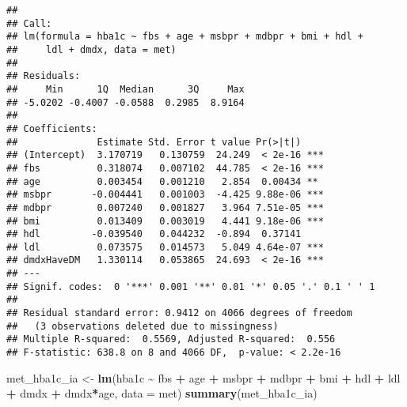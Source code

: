 \documentclass[
]{article}
\newenvironment{Shaded}{\begin{snugshade}}{\end{snugshade}}
\newcommand{\AttributeTok}[1]{\textcolor[rgb]{0.13,0.29,0.53}{#1}}
\newcommand{\FunctionTok}[1]{\textcolor[rgb]{0.13,0.29,0.53}{\textbf{#1}}}
\newcommand{\NormalTok}[1]{#1}
\newcommand{\OtherTok}[1]{\textcolor[rgb]{0.56,0.35,0.01}{#1}}
\newcommand{\SpecialCharTok}[1]{\textcolor[rgb]{0.81,0.36,0.00}{\textbf{#1}}}
\begin{document}
\begin{verbatim}
## 
## Call:
## lm(formula = hba1c ~ fbs + age + msbpr + mdbpr + bmi + hdl + 
##     ldl + dmdx, data = met)
## 
## Residuals:
##     Min      1Q  Median      3Q     Max 
## -5.0202 -0.4007 -0.0588  0.2985  8.9164 
## 
## Coefficients:
##              Estimate Std. Error t value Pr(>|t|)    
## (Intercept)  3.170719   0.130759  24.249  < 2e-16 ***
## fbs          0.318074   0.007102  44.785  < 2e-16 ***
## age          0.003454   0.001210   2.854  0.00434 ** 
## msbpr       -0.004441   0.001003  -4.425 9.88e-06 ***
## mdbpr        0.007240   0.001827   3.964 7.51e-05 ***
## bmi          0.013409   0.003019   4.441 9.18e-06 ***
## hdl         -0.039540   0.044232  -0.894  0.37141    
## ldl          0.073575   0.014573   5.049 4.64e-07 ***
## dmdxHaveDM   1.330114   0.053865  24.693  < 2e-16 ***
## ---
## Signif. codes:  0 '***' 0.001 '**' 0.01 '*' 0.05 '.' 0.1 ' ' 1
## 
## Residual standard error: 0.9412 on 4066 degrees of freedom
##   (3 observations deleted due to missingness)
## Multiple R-squared:  0.5569, Adjusted R-squared:  0.556 
## F-statistic: 638.8 on 8 and 4066 DF,  p-value: < 2.2e-16
\end{verbatim}

\begin{Shaded}
\begin{Highlighting}[]
\NormalTok{met\_hba1c\_ia }\OtherTok{\textless{}{-}} \FunctionTok{lm}\NormalTok{(hba1c }\SpecialCharTok{\textasciitilde{}}\NormalTok{ fbs }\SpecialCharTok{+}\NormalTok{ age }\SpecialCharTok{+}\NormalTok{ msbpr }\SpecialCharTok{+}\NormalTok{ mdbpr }\SpecialCharTok{+}\NormalTok{ bmi }\SpecialCharTok{+}\NormalTok{ hdl }\SpecialCharTok{+}\NormalTok{ ldl }\SpecialCharTok{+}\NormalTok{ dmdx }\SpecialCharTok{+}
\NormalTok{                     dmdx}\SpecialCharTok{*}\NormalTok{age, }\AttributeTok{data =}\NormalTok{ met)}
\FunctionTok{summary}\NormalTok{(met\_hba1c\_ia)}
\end{Highlighting}
\end{Shaded}
\end{document}
